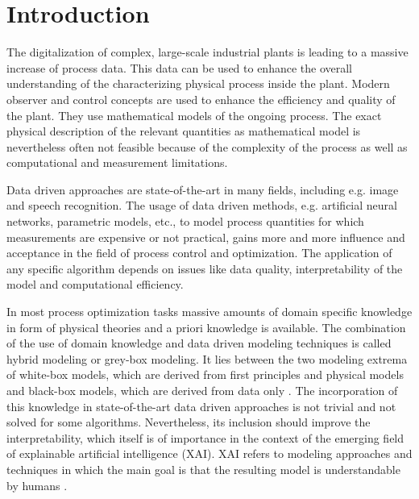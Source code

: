 
\chapter{Introduction} \label{cha:introduction}


The digitalization of complex, large-scale industrial plants is leading to a massive increase of process data. This data can be used to enhance the overall understanding of the characterizing physical process inside the plant. Modern observer and control concepts are used to enhance the efficiency and quality  of the plant. They use mathematical models of the ongoing process. The exact physical description of the relevant quantities as mathematical model is nevertheless often not feasible because of the complexity of the process as well as computational and measurement limitations.

Data driven approaches are state-of-the-art in many fields, including e.g. image and speech recognition. The usage of data driven methods, e.g. artificial neural networks, parametric models, etc., to model process quantities for which measurements are expensive or not practical, gains more and more influence and acceptance in the field of process control and optimization. The application of any specific algorithm depends on issues like data quality, interpretability of the model and computational efficiency. 

In most process optimization tasks massive amounts of domain specific knowledge in form of physical theories and a priori knowledge is available. The combination of the use of domain knowledge and data driven modeling techniques is called hybrid modeling or grey-box modeling. It lies between the two modeling extrema of white-box models, which are derived from first principles and physical models and black-box models, which are derived from data only \cite{ashby1961introduction}. The incorporation of this knowledge in state-of-the-art data driven approaches is not trivial and not solved for some algorithms. Nevertheless, its inclusion should improve the interpretability, which itself is of importance in the context of the emerging field of explainable artificial intelligence (XAI). XAI refers to modeling approaches and techniques in which the main goal is that the resulting model is understandable by humans \cite{dovsilovic2018explainable}.

